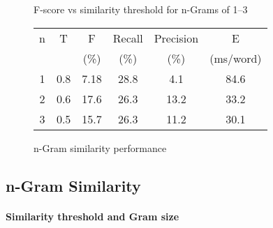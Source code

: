 \documentclass[twocolumn]{article}
\begin{document}


    \begin{figure}[h]
        \caption{F-score vs similarity threshold for n-Grams of 1--3}
        \label{fig:nGPlot}
\end{figure}

\begin{figure}[b]

        \begin{center}
        \begin{tabular}{|c|c|c|c|c|c|}

            \hline
            n & T & F & Recall & Precision & E\\
             &  & (\%) &(\%)& (\%)&(ms/word)\\
            \hline\hline
            1 & 0.8 & 7.18 & 28.8 & 4.1 & 84.6\\
            2 & 0.6 & 17.6 & 26.3 & 13.2 & 33.2\\
            3 & 0.5 & 15.7 & 26.3 & 11.2 & 30.1\\

            \hline
        \end{tabular}
        \end{center}
        \caption{n-Gram similarity performance}
        \label{fig:nGTable}
    \end{figure}


\subsection{n-Gram Similarity}
    \paragraph{Similarity threshold and Gram size}
\end{document}
